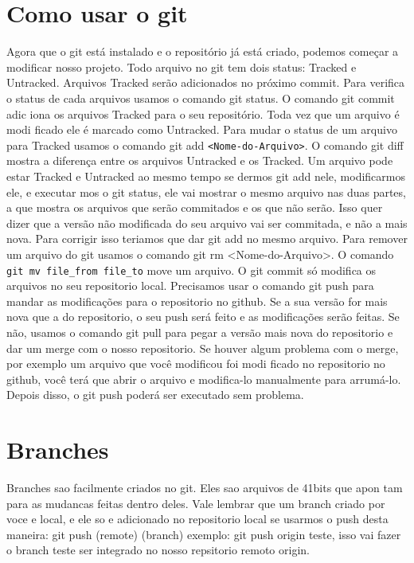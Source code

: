 \documentclass[12pt,onecolumn]{article}
\begin{document}
\section{Como usar o git}
	Agora que o git está instalado e o repositório já está criado, podemos
começar a modificar nosso projeto. Todo arquivo no git tem dois status: Tracked
e Untracked. Arquivos Tracked serão adicionados no próximo commit. Para verifica
o status de cada arquivos usamos o comando git status. O comando git commit adic
iona os arquivos Tracked para o seu repositório. Toda vez que um arquivo é modi
ficado ele é marcado como Untracked. Para mudar o status de um arquivo para 
Tracked usamos o comando git add \verb#<Nome-do-Arquivo>#. O comando git diff mostra a 
diferença entre os arquivos Untracked e os Tracked. Um arquivo pode estar Tracked
e Untracked ao mesmo tempo se dermos git add nele, modificarmos ele, e executar
mos o git status, ele vai mostrar o mesmo arquivo nas duas partes, a que mostra 
os arquivos que serão commitados e os que não serão. Isso quer dizer que a versão
não modificada do seu arquivo vai ser commitada, e não a mais nova. Para corrigir
isso teriamos que dar git add no mesmo arquivo. Para remover um arquivo do git 
usamos o comando git rm <Nome-do-Arquivo>. O comando \verb#git mv file_from file_to#
move um arquivo.
	O git commit só modifica os arquivos no seu repositorio local. Precisamos 
usar o comando git push para mandar as modificações para o repositorio no github.
Se a sua versão for mais nova que a do repositorio, o seu push será feito e as 
modificações serão feitas. Se não, usamos o comando git pull para pegar a versão
mais nova do repositorio e dar um merge com o nosso repositorio. Se houver
algum problema com o merge, por exemplo um arquivo que você modificou foi modi
ficado no repositorio no github, você terá que abrir o arquivo e modifica-lo
manualmente para arrumá-lo. Depois disso, o git push poderá ser executado sem
problema.


\section{Branches}
    Branches sao facilmente criados no git. Eles sao arquivos de 41bits que apon
tam para as mudancas feitas dentro deles. Vale lembrar que um branch criado por
voce e local, e ele so e adicionado no repositorio local se usarmos o push desta
maneira:
    git push (remote) (branch)
exemplo: git push origin teste, isso vai fazer o branch teste ser integrado
no nosso repsitorio remoto origin.
\end{document}
